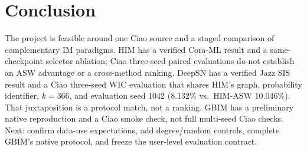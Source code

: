 \documentclass[10pt,twocolumn]{article}
\begin{document}
\section{Conclusion}
The project is feasible around one Ciao source and a staged comparison of complementary IM paradigms. HIM has a verified Cora-ML result and a same-checkpoint selector ablation; Ciao three-seed paired evaluations do not establish an ASW advantage or a cross-method ranking. DeepSN has a verified Jazz SIS result and a Ciao three-seed WIC evaluation that shares HIM's graph, probability identifier, $k=366$, and evaluation seed 1042 (8.132\% vs.\ HIM-ASW 10.046\%). That juxtaposition is a protocol match, not a ranking. GBIM has a preliminary native reproduction and a Ciao smoke check, not full multi-seed Ciao checks. Next: confirm data-use expectations, add degree/random controls, complete GBIM's native protocol, and freeze the user-level evaluation contract.
\end{document}
